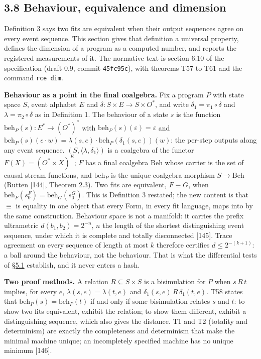 \documentclass[10pt,letterpaper]{article}
\begin{document}
\subsection{3.8 Behaviour, equivalence and
dimension}\label{behaviour-equivalence-and-dimension}

Definition 3 says two fits are equivalent when their output sequences
agree on every event sequence. This section gives that definition a
universal property, defines the dimension of a program as a computed
number, and reports the registered measurements of it. The normative
text is section 6.10 of the specification (draft 0.9, commit
\texttt{45fc95c}), with theorems T57 to T61 and the command
\texttt{rce\ dim}.

\textbf{Behaviour as a point in the final coalgebra.} Fix a program
\(P\) with state space \(S\), event alphabet \(E\) and
\(\delta : S \times E \to S \times O^*\), and write
\(\delta_1 = \pi_1 \circ \delta\) and \(\lambda = \pi_2 \circ \delta\)
as in Definition 1. The behaviour of a state \(s\) is the function
\(\mathrm{beh}_P(s) : E^* \to (O^*)^*\) with
\(\mathrm{beh}_P(s)(\varepsilon) = \varepsilon\) and
\(\mathrm{beh}_P(s)(e \cdot w) = \lambda(s, e) \cdot \mathrm{beh}_P(\delta_1(s, e))(w)\):
the per-step outputs along any event sequence.
\((S, \langle \lambda, \delta_1 \rangle)\) is a coalgebra of the functor
\(F(X) = (O^* \times X)^E\); \(F\) has a final coalgebra
\(\mathrm{Beh}\) whose carrier is the set of causal stream functions,
and \(\mathrm{beh}_P\) is the unique coalgebra morphism
\(S \to \mathrm{Beh}\) (Rutten {[}144{]}, Theorem 2.3). Two fits are
equivalent, \(F \equiv G\), when
\(\mathrm{beh}_F(s_0^F) = \mathrm{beh}_G(s_0^G)\). This is Definition 3
restated; the new content is that \(\equiv\) is equality in one object
that every Form, in every fit language, maps into by the same
construction. Behaviour space is not a manifold: it carries the prefix
ultrametric \(d(b_1, b_2) = 2^{-n}\), \(n\) the length of the shortest
distinguishing event sequence, under which it is complete and totally
disconnected {[}145{]}. Trace agreement on every sequence of length at
most \(k\) therefore certifies \(d \le 2^{-(k+1)}\): a ball around the
behaviour, not the behaviour. That is what the differential tests of
\href{https://research.openie.dev/papers/rce/\#51-differential-testing-of-the-program-emitters}{§5.1}
establish, and it never enters a hash.

\textbf{Two proof methods.} A relation \(R \subseteq S \times S\) is a
bisimulation for \(P\) when \(s\,R\,t\) implies, for every \(e\),
\(\lambda(s, e) = \lambda(t, e)\) and
\(\delta_1(s, e)\,R\,\delta_1(t, e)\). T58 states that
\(\mathrm{beh}_P(s) = \mathrm{beh}_P(t)\) if and only if some
bisimulation relates \(s\) and \(t\): to show two fits equivalent,
exhibit the relation; to show them different, exhibit a distinguishing
sequence, which also gives the distance. T1 and T2 (totality and
determinism) are exactly the completeness and determinism that make the
minimal machine unique; an incompletely specified machine has no unique
minimum {[}146{]}.
\end{document}
